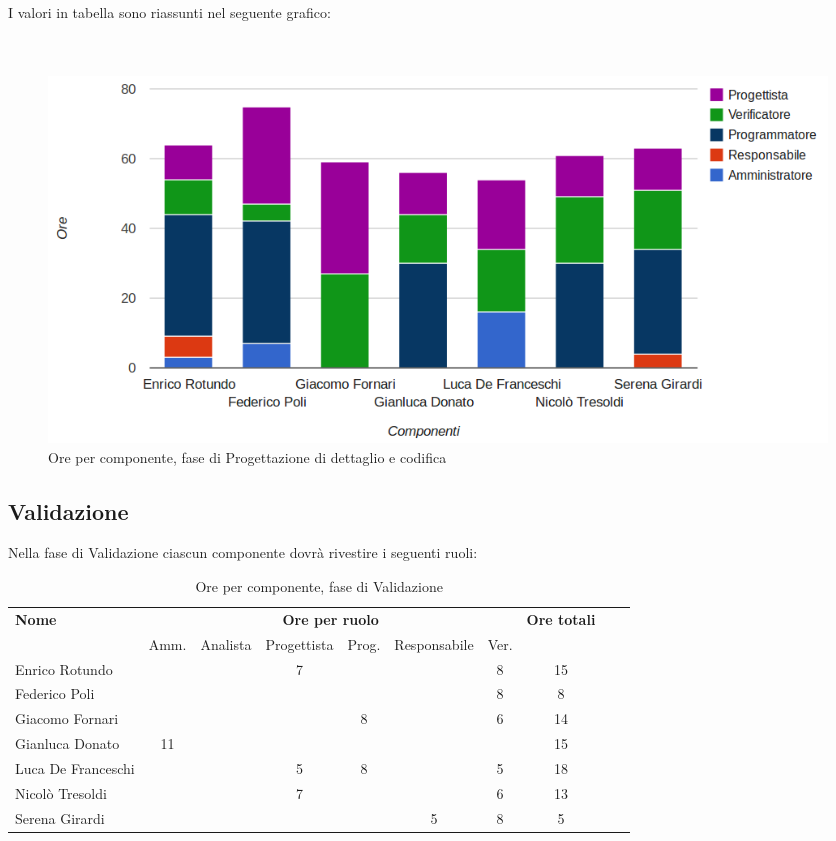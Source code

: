 I valori in tabella sono riassunti nel seguente grafico: \\ \\ \\

\begin{figure}[H]
\centering
\includegraphics[scale=0.35]{4-3.png}
\caption{Ore per componente, fase di Progettazione di dettaglio e codifica \label{fig:nome}}
\end{figure}

\subsection{Validazione}

Nella fase di Validazione ciascun componente dovrà rivestire i seguenti ruoli:

\begin{table}[H]
\centering
\begin{tabular}{lccccccccc}
\toprule 
    \textbf{Nome}  & \multicolumn{6}{c}{\textbf{Ore per ruolo}} & \textbf{Ore totali}\\
    & Amm. & Analista & Progettista
    & Prog. & Responsabile & Ver. \\
    \midrule
    Enrico Rotundo   	&   &  &	 7	&   &   & 8 & 15 \\
    Federico Poli  		& 	&  &	 	&   &   & 8 & 8  \\
    Giacomo Fornari		& 	&  &	 	& 8 &   & 6 & 14 \\
    Gianluca Donato 		& 11	&  &	 	&   &   &   & 15 \\
    Luca De Franceschi 	& 	&  &	 5	& 8 &   & 5 & 18 \\
    Nicolò Tresoldi 		& 	&  &	 7	&   &   & 6 & 13 \\
    Serena Girardi 		& 	&  &	 	&   & 5 & 8 & 5  \\
    
    \bottomrule
\end{tabular}
\caption{Ore per componente, fase di Validazione}
\end{table}

